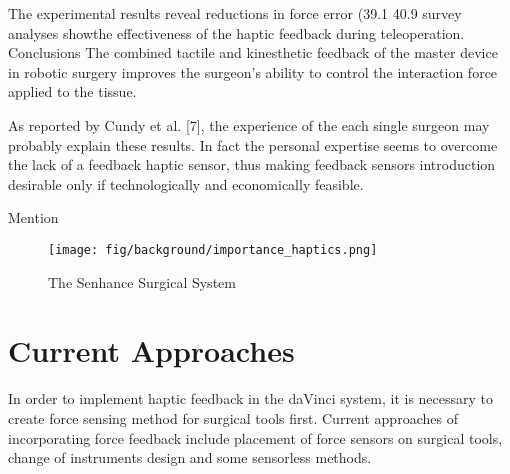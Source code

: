 The experimental results reveal reductions in force error (39.1%
40.9%
survey analyses showthe effectiveness of the haptic feedback during teleoperation.
Conclusions The combined tactile and kinesthetic feedback of the master
device in robotic surgery improves the surgeon’s ability to control the interaction
force applied to the tissue. \cite{lim_role_2015}

As reported by Cundy et al. [7], the experience of the each
single surgeon may probably explain these results. In fact
the personal expertise seems to overcome the lack of a
feedback haptic sensor, thus making feedback sensors
introduction desirable only if technologically and economically
feasible.

Mention 


\begin{figure}[h]
	\begin{center}
	\texttt{[image: fig/background/importance\_haptics.png]}
	\end{center}
	\vspace{-4mm}
	\caption[The Senhance Surgical System]
	{The Senhance Surgical System}
	\label{fig:Senhance}
	\vspace{-2mm}
\end{figure}

\section{Current Approaches}
\label{sec:CurAppr}

In order to implement haptic feedback in the daVinci system, it is necessary to create force sensing method for surgical tools first. Current approaches of incorporating force feedback include placement of force sensors on surgical tools, change of instruments design and some sensorless methods.

